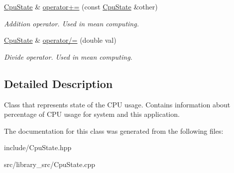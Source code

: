 \begin{DoxyCompactItemize}
\item 
\hyperlink{classCpuState}{Cpu\+State} \& \hyperlink{classCpuState_a809a06f39eb017c89b6d9e025fa19e20}{operator+=} (const \hyperlink{classCpuState}{Cpu\+State} \&other)\hypertarget{classCpuState_a809a06f39eb017c89b6d9e025fa19e20}{}\label{classCpuState_a809a06f39eb017c89b6d9e025fa19e20}

\begin{DoxyCompactList}\small\item\em Addition operator. Used in mean computing. \end{DoxyCompactList}\item 
\hyperlink{classCpuState}{Cpu\+State} \& \hyperlink{classCpuState_a3e436b173911d6ac8bed63cb2d6b3566}{operator/=} (double val)\hypertarget{classCpuState_a3e436b173911d6ac8bed63cb2d6b3566}{}\label{classCpuState_a3e436b173911d6ac8bed63cb2d6b3566}

\begin{DoxyCompactList}\small\item\em Divide operator. Used in mean computing. \end{DoxyCompactList}\end{DoxyCompactItemize}


\subsection{Detailed Description}
Class that represents state of the C\+PU usage. Contains information about percentage of C\+PU usage for system and this application. 

The documentation for this class was generated from the following files\+:\begin{DoxyCompactItemize}
\item 
include/Cpu\+State.\+hpp\item 
src/library\+\_\+src/Cpu\+State.\+cpp\end{DoxyCompactItemize}
